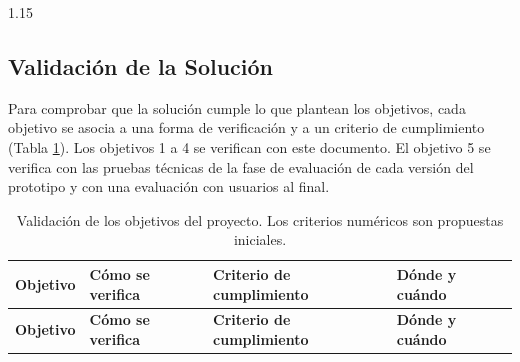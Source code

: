 \begin{spacing}{1.15}
\vspace{0.5cm}
\begin{center}
\end{center}

\subsection{Validación de la Solución}
Para comprobar que la solución cumple lo que plantean los objetivos, cada objetivo se asocia a una forma de verificación y a un criterio de cumplimiento (Tabla \ref{tab:validacion}). Los objetivos 1 a 4 se verifican con este documento. El objetivo 5 se verifica con las pruebas técnicas de la fase de evaluación de cada versión del prototipo y con una evaluación con usuarios al final.

{\small
\renewcommand{\arraystretch}{1.3}
\begin{longtable}{|>{\raggedright\arraybackslash}p{2.9cm}|>{\raggedright\arraybackslash}p{4.6cm}|>{\raggedright\arraybackslash}p{4.4cm}|>{\raggedright\arraybackslash}p{2.6cm}|}
    \caption{Validación de los objetivos del proyecto. Los criterios numéricos son propuestas iniciales.}\label{tab:validacion}\\
    \hline
    \rowcolor[HTML]{EFEFEF}
        \textbf{Objetivo} & \textbf{Cómo se verifica} & \textbf{Criterio de cumplimiento} & \textbf{Dónde y cuándo} \\ \hline
    \endfirsthead
    \hline
    \rowcolor[HTML]{EFEFEF}
        \textbf{Objetivo} & \textbf{Cómo se verifica} & \textbf{Criterio de cumplimiento} & \textbf{Dónde y cuándo} \\ \hline
    \endhead


\end{longtable}}
\end{spacing}
